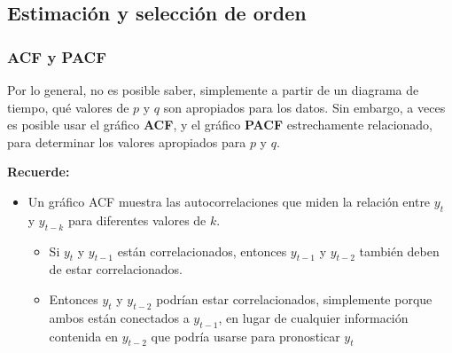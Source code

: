 \documentclass[10pt]{beamer}
\begin{document}





\subsection{Estimación y selección de orden}

\begin{frame}[fragile]
\frametitle{ACF y PACF}


Por lo general, no es posible saber, simplemente a partir de un diagrama de tiempo, qué valores de $p$ y $q$ son apropiados para los datos. Sin embargo, a veces es posible usar el gráfico \textbf{ACF}, y el gráfico \textbf{PACF} estrechamente relacionado, para determinar los valores apropiados para $p$ y $q$.

\vspace{4mm}

\textbf{Recuerde:}

{\small
\begin{itemize}
\item Un gráfico ACF muestra las autocorrelaciones que miden la relación entre $y_t$ y $y_{t-k}$  para diferentes valores de $k$.
\begin{itemize}
\item Si $y_t$ y $y_{t-1}$ están correlacionados, entonces $y_{t-1}$ y $y_{t-2}$ también deben de estar correlacionados.
\item Entonces $y_t$ y $y_{t-2}$ podrían estar correlacionados, simplemente porque ambos están conectados a $y_{t-1}$, en lugar de cualquier información contenida en $y_{t-2}$ que podría usarse para pronosticar $y_t$
\end{itemize}
 
\end{itemize}
}

\end{frame}


\end{document}
